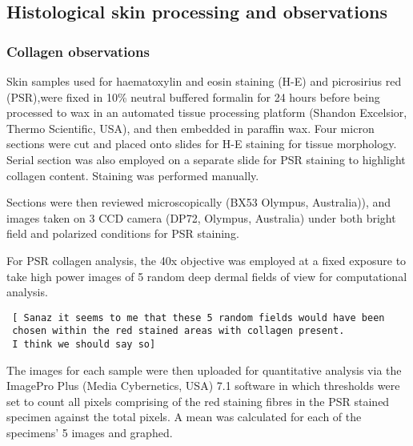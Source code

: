\documentclass[titlepage]{article}  %
\begin{document}
\subsection{Histological skin processing and observations}
\subsubsection{Collagen observations}

Skin samples used for haematoxylin and eosin staining (H-E) and
picrosirius red (PSR),were fixed in 10\% neutral buffered formalin for
24 hours before being processed to wax in an automated tissue
processing platform (Shandon Excelsior, Thermo Scientific, USA), and
then embedded in paraffin wax. Four micron sections were cut and placed
onto slides for H-E staining for tissue morphology. Serial section was
also employed on a separate slide for PSR staining to highlight
collagen content. Staining was performed manually.

Sections were then reviewed microscopically (BX53 Olympus, Australia)),
and images taken on 3 CCD camera (DP72, Olympus, Australia) under both
bright field and polarized conditions for PSR staining.

For PSR collagen analysis, the 40x objective was employed at a fixed
exposure to take high power images of 5 random deep dermal fields of
view for computational analysis. 

\begin{verbatim}
 [ Sanaz it seems to me that these 5 random fields would have been
 chosen within the red stained areas with collagen present. 
 I think we should say so]
\end{verbatim}

The images for each sample were then uploaded for quantitative analysis
via the ImagePro Plus (Media Cybernetics, USA) 7.1 software in which
thresholds were set to count all pixels comprising of the red staining
fibres in the PSR stained specimen against the total pixels. A mean was
calculated for each of the specimens{\textquoteright} 5 images and
graphed.
\end{document}
